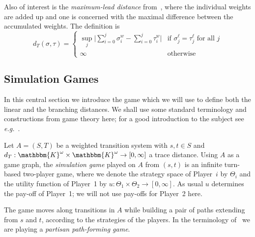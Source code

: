 \documentclass[copyright,creativecommons,sharealike]{eptcs}
\theoremstyle{plain}
\newcommand*\Strat{\Theta}
\renewcommand*\K{\mathbbm{K}}
\newcommand*\eg{\textit{e.g.}}
\begin{document}
Also of interest is the \emph{maximum-lead distance}
from~\cite{conf/formats/2005/HenzM05}, where the individual weights
are added up and one is concerned with the maximal difference between
the accumulated weights.  The definition is
\begin{equation*}
  d_T( \sigma, \tau)=
    \begin{cases}
      \sup_j \bigl| \sum_{i= 0}^j \sigma^w_i - \sum_{i= 0}^j
      \tau^w_i\bigr| &\text{if }
      \sigma^\ell_j= \tau^\ell_j \text{ for all } j \\
      \infty &\text{otherwise}
    \end{cases}  
\end{equation*}

\subsection{Simulation Games}
\label{se:wsg}

In this central section we introduce the game which we will use to
define both the linear and the branching distances.  We shall use some
standard terminology and constructions from game theory here; for a
good introduction to the subject see \eg~\cite{Ferguson}.

Let $A=( S, T)$ be a weighted transition system with $s, t\in
S$ and $d_T: \K^\omega\times \K^\omega\to[ 0, \infty]$ a trace
distance. Using $A$ as a game graph, the \emph{simulation game} played
on $A$ from $( s, t)$ is an infinite turn-based two-player game,
where we denote the strategy space of Player~$i$ by $\Strat_i$ and the
utility function of Player~1 by $u: \Strat_1 \times \Strat_2 \to[ 0,
\infty]$.  As usual $u$ determines the pay-off of Player~1; we will
not use pay-offs for Player~2 here.

The game moves along transitions in $A$ while building a pair of paths
extending from $s$ and $t$, according to the strategies of the
players.  In the terminology
of~\cite{DBLP:journals/tcs/Bodlaender93,DBLP:journals/tcs/FraenkelS93}
we are playing a \emph{partisan path-forming game}.
\end{document}
